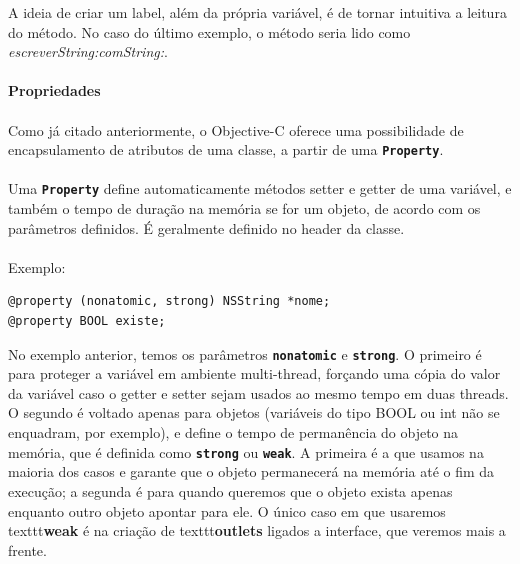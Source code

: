 \documentclass[a4paper,12pt,brazil,doubleside]{book}
\begin{document}
A ideia de criar um label, além da própria variável, é de tornar intuitiva a leitura do método. No caso do último exemplo, o método seria lido como \emph{escreverString:comString:}.\\

\paragraph{}\textbf{Propriedades}

\paragraph{}Como já citado anteriormente, o Objective-C oferece uma possibilidade de encapsulamento de atributos de uma classe, a partir de uma \texttt{\textbf{Property}}.
\paragraph{}Uma \texttt{\textbf{Property}} define automaticamente métodos setter e getter de uma variável, e também o tempo de duração na memória se for um objeto, de acordo com os parâmetros definidos. É geralmente definido no header da classe.
\paragraph{}Exemplo:

\begin{listing}
\begin{verbatim}
@property (nonatomic, strong) NSString *nome;
@property BOOL existe;
\end{verbatim}
\end{listing}

No exemplo anterior, temos os parâmetros \texttt{\textbf{nonatomic}} e \texttt{\textbf{strong}}. O primeiro é para proteger a variável em ambiente multi-thread, forçando uma cópia do valor da variável caso o getter e setter sejam usados ao mesmo tempo em duas threads. O segundo é voltado apenas para objetos (variáveis do tipo BOOL ou int não se enquadram, por exemplo), e define o tempo de permanência do objeto na memória, que é definida como \texttt{\textbf{strong}} ou \texttt{\textbf{weak}}. A primeira é a que usamos na maioria dos casos e garante que o objeto permanecerá na memória até o fim da execução; a segunda é para quando queremos que o objeto exista apenas enquanto outro objeto apontar para ele. O único caso em que usaremos texttt{\textbf{weak}} é na criação de texttt{\textbf{outlets}} ligados a interface, que veremos mais a frente.
\end{document}
